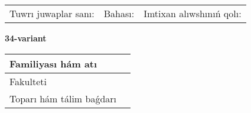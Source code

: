 \documentclass{article}
\begin{document}
\vspace{1cm}

\begin{tabular}{lll}
Tuwrı juwaplar sanı: \underline{\hspace{1.5cm}} & 
Bahası: \underline{\hspace{1.5cm}} & 
Imtixan alıwshınıń qolı: \underline{\hspace{2cm}} \\
\end{tabular}

\egroup

\newpage


\textbf{34-variant}\\

\bgroup
\def\arraystretch{1.6} %

\begin{tabular}{|m{5.7cm}|m{9.5cm}|}
\hline
Familiyası hám atı & \\
\hline
Fakulteti  & \\
\hline
Toparı hám tálim baǵdarı  & \\
\hline
\end{tabular}

\vspace{1cm}
\end{document}
